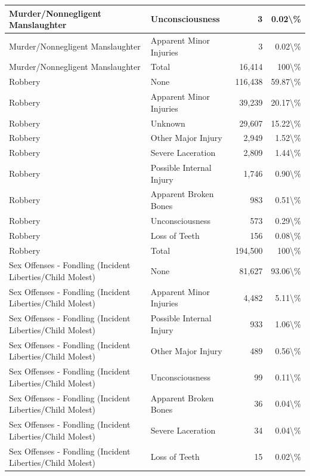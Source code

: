 \documentclass[
]{krantz}
\begin{document}
\begin{longtable}[t]{l|l|r|r}
\hline
Murder/Nonnegligent Manslaughter & Unconsciousness & 3 & 0.02\textbackslash{}\%\\
\hline
Murder/Nonnegligent Manslaughter & Apparent Minor Injuries & 3 & 0.02\textbackslash{}\%\\
\hline
Murder/Nonnegligent Manslaughter & Total & 16,414 & 100\textbackslash{}\%\\
\hline
Robbery & None & 116,438 & 59.87\textbackslash{}\%\\
\hline
Robbery & Apparent Minor Injuries & 39,239 & 20.17\textbackslash{}\%\\
\hline
Robbery & Unknown & 29,607 & 15.22\textbackslash{}\%\\
\hline
Robbery & Other Major Injury & 2,949 & 1.52\textbackslash{}\%\\
\hline
Robbery & Severe Laceration & 2,809 & 1.44\textbackslash{}\%\\
\hline
Robbery & Possible Internal Injury & 1,746 & 0.90\textbackslash{}\%\\
\hline
Robbery & Apparent Broken Bones & 983 & 0.51\textbackslash{}\%\\
\hline
Robbery & Unconsciousness & 573 & 0.29\textbackslash{}\%\\
\hline
Robbery & Loss of Teeth & 156 & 0.08\textbackslash{}\%\\
\hline
Robbery & Total & 194,500 & 100\textbackslash{}\%\\
\hline
Sex Offenses - Fondling (Incident Liberties/Child Molest) & None & 81,627 & 93.06\textbackslash{}\%\\
\hline
Sex Offenses - Fondling (Incident Liberties/Child Molest) & Apparent Minor Injuries & 4,482 & 5.11\textbackslash{}\%\\
\hline
Sex Offenses - Fondling (Incident Liberties/Child Molest) & Possible Internal Injury & 933 & 1.06\textbackslash{}\%\\
\hline
Sex Offenses - Fondling (Incident Liberties/Child Molest) & Other Major Injury & 489 & 0.56\textbackslash{}\%\\
\hline
Sex Offenses - Fondling (Incident Liberties/Child Molest) & Unconsciousness & 99 & 0.11\textbackslash{}\%\\
\hline
Sex Offenses - Fondling (Incident Liberties/Child Molest) & Apparent Broken Bones & 36 & 0.04\textbackslash{}\%\\
\hline
Sex Offenses - Fondling (Incident Liberties/Child Molest) & Severe Laceration & 34 & 0.04\textbackslash{}\%\\
\hline
Sex Offenses - Fondling (Incident Liberties/Child Molest) & Loss of Teeth & 15 & 0.02\textbackslash{}\%\\

\end{longtable}
\end{document}
